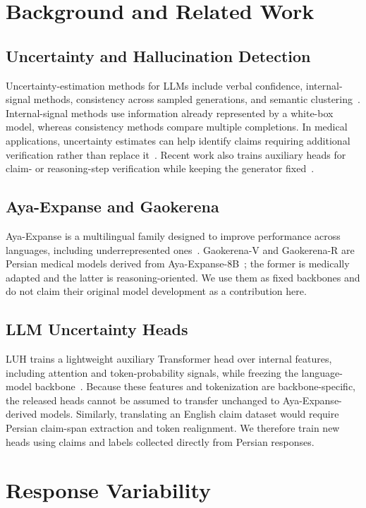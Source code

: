 \documentclass[conference,a4paper]{IEEEtran}
\begin{document}
\section{Background and Related Work}
\subsection{Uncertainty and Hallucination Detection}
Uncertainty-estimation methods for LLMs include verbal confidence, internal-signal methods, consistency across sampled generations, and semantic clustering~\cite{b4}. Internal-signal methods use information already represented by a white-box model, whereas consistency methods compare multiple completions. In medical applications, uncertainty estimates can help identify claims requiring additional verification rather than replace it~\cite{b5,b6}. Recent work also trains auxiliary heads for claim- or reasoning-step verification while keeping the generator fixed~\cite{b7}.

\subsection{Aya-Expanse and Gaokerena}
Aya-Expanse is a multilingual family designed to improve performance across languages, including underrepresented ones~\cite{b8,b9,b10}. Gaokerena-V and Gaokerena-R are Persian medical models derived from Aya-Expanse-8B~\cite{b2,b3}; the former is medically adapted and the latter is reasoning-oriented. We use them as fixed backbones and do not claim their original model development as a contribution here.

\subsection{LLM Uncertainty Heads}
LUH trains a lightweight auxiliary Transformer head over internal features, including attention and token-probability signals, while freezing the language-model backbone~\cite{b1}. Because these features and tokenization are backbone-specific, the released heads cannot be assumed to transfer unchanged to Aya-Expanse-derived models. Similarly, translating an English claim dataset would require Persian claim-span extraction and token realignment. We therefore train new heads using claims and labels collected directly from Persian responses.

\section{Response Variability}
\end{document}
